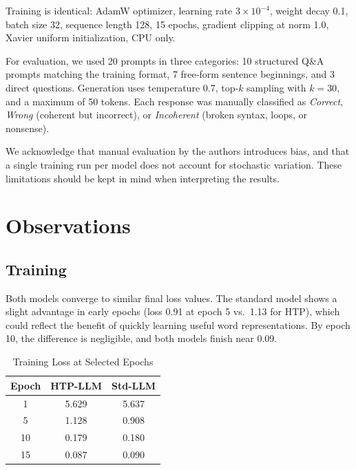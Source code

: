\documentclass[10pt,twocolumn,a4paper]{article}
\newcommand{\htpname}{HTP}
\newcommand{\htpmodel}{HTP-LLM}
\newcommand{\stdmodel}{Std-LLM}
\begin{document}
Training is identical: AdamW optimizer, learning rate $3 \times 10^{-4}$, weight decay 0.1, batch size 32, sequence length 128, 15 epochs, gradient clipping at norm 1.0, Xavier uniform initialization, CPU only.

For evaluation, we used 20 prompts in three categories: 10 structured Q\&A prompts matching the training format, 7 free-form sentence beginnings, and 3 direct questions. Generation uses temperature 0.7, top-$k$ sampling with $k=30$, and a maximum of 50 tokens. Each response was manually classified as \textit{Correct}, \textit{Wrong} (coherent but incorrect), or \textit{Incoherent} (broken syntax, loops, or nonsense).

We acknowledge that manual evaluation by the authors introduces bias, and that a single training run per model does not account for stochastic variation. These limitations should be kept in mind when interpreting the results.

\section{Observations}
\label{sec:results}

\subsection{Training}

Both models converge to similar final loss values. The standard model shows a slight advantage in early epochs (loss 0.91 at epoch 5 vs.\ 1.13 for \htpname{}), which could reflect the benefit of quickly learning useful word representations. By epoch 10, the difference is negligible, and both models finish near 0.09.

\begin{table}[h]
\centering
\caption{Training Loss at Selected Epochs}
\label{tab:convergence}
\begin{tabular}{ccc}
\toprule
\textbf{Epoch} & \textbf{\htpmodel{}} & \textbf{\stdmodel{}} \\
\midrule
1 & 5.629 & 5.637 \\
5 & 1.128 & 0.908 \\
10 & 0.179 & 0.180 \\
15 & 0.087 & 0.090 \\
\bottomrule
\end{tabular}
\end{table}
\end{document}
